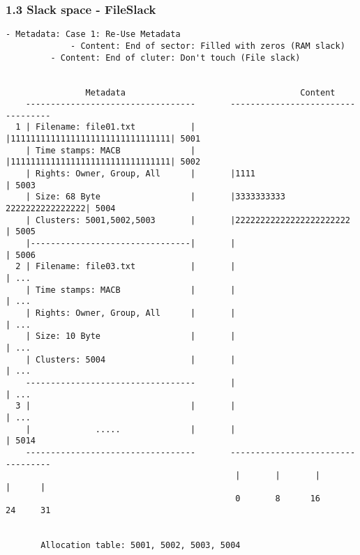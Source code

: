 \begin{frame}[fragile]
  \frametitle{1.3 Slack space - FileSlack}
  \begin{lstlisting}[basicstyle=\tiny\ttfamily]
             - Metadata: Case 1: Re-Use Metadata
             - Content: End of sector: Filled with zeros (RAM slack)
	     - Content: End of cluter: Don't touch (File slack)
                            

                Metadata                                   Content     
    ----------------------------------       ----------------------------------
  1 | Filename: file01.txt           |       |11111111111111111111111111111111| 5001
    | Time stamps: MACB              |       |11111111111111111111111111111111| 5002
    | Rights: Owner, Group, All      |       |1111                            | 5003
    | Size: 68 Byte                  |       |3333333333      2222222222222222| 5004
    | Clusters: 5001,5002,5003       |       |22222222222222222222222         | 5005
    |--------------------------------|       |                                | 5006
  2 | Filename: file03.txt           |       |                                | ...
    | Time stamps: MACB              |       |                                | ...
    | Rights: Owner, Group, All      |       |                                | ...
    | Size: 10 Byte                  |       |                                | ...
    | Clusters: 5004                 |       |                                | ...
    ----------------------------------       |                                | ...
  3 |                                |       |                                | ...
    |             .....              |       |                                | 5014
    ----------------------------------       ----------------------------------
                                              |       |       |       |      |
                                              0       8      16      24     31
 

       Allocation table: 5001, 5002, 5003, 5004
  \end{lstlisting}
\end{frame}


